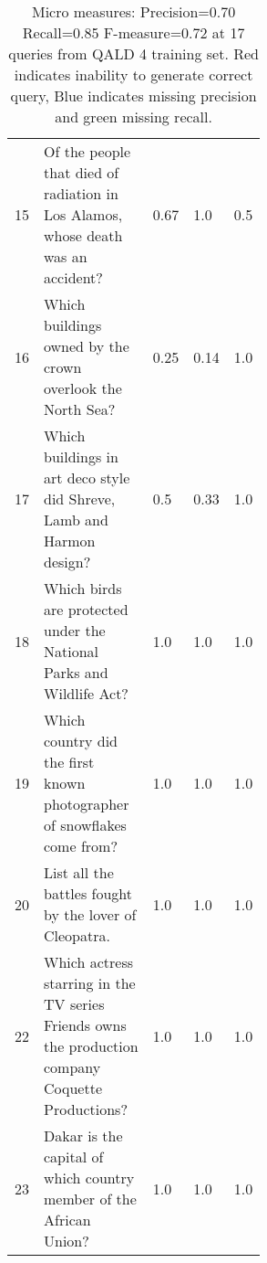 \begin{table}[htb!]
{\begin{tabular}{@{\extracolsep{\fill} } @{}lp{0.55\linewidth}lll@{}}
\rowcolor[HTML]{9AFF99} 
15          & Of the people that died of radiation in Los Alamos, whose death was an accident?                  & 0.67               & 1.0                & 0.5             \\
\rowcolor[HTML]{BBDAFF} 
16          & Which buildings owned by the crown overlook the North Sea?                                        & 0.25               & 0.14               & 1.0             \\
\rowcolor[HTML]{BBDAFF} 
17          & Which buildings in art deco style did Shreve, Lamb and Harmon design?                             & 0.5                & 0.33               & 1.0             \\
18          & Which birds are protected under the National Parks and Wildlife Act?                              & 1.0                & 1.0                & 1.0             \\
19          & Which country did the first known photographer of snowflakes come from?                           & 1.0                & 1.0                & 1.0             \\
20          & List all the battles fought by the lover of Cleopatra.                                            & 1.0                & 1.0                & 1.0             \\
22          & Which actress starring in the TV series Friends owns the production company Coquette Productions? & 1.0                & 1.0                & 1.0             \\
23          & Dakar is the capital of which country member of the African Union?                                & 1.0                & 1.0                & 1.0             \\ \bottomrule
\end{tabular}}
\caption{Micro measures: Precision=0.70 Recall=0.85 F-measure=0.72 at 17 queries from QALD 4 training set. Red indicates inability to generate correct query, Blue indicates missing precision and green missing recall.}
\label{tab:trainqueries}

\end{table}